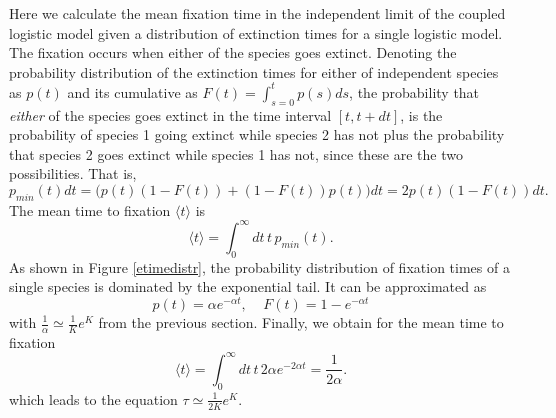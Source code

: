 Here we calculate the mean fixation time in the independent limit of the coupled logistic model given a distribution of extinction times for a single logistic model. The fixation occurs when either of the species goes extinct. 
Denoting the probability distribution of the extinction times for either of independent species as $p(t)$ and its cumulative as $F(t)=\int_{s=0}^t p(s)ds$, the probability that \emph{either} of the species goes extinct in the time interval $[t,t+dt]$, is the probability of species 1 going extinct while species 2 has not plus the probability that species 2 goes extinct while species 1 has not, since these are the two possibilities. 
That is,
\begin{equation}
p_{min}(t)dt = \bigg(p(t)\left(1-F(t)\right)+\left(1-F(t)\right)p(t)\bigg)dt = 2p(t)\left(1-F(t)\right)dt.
\end{equation}
The mean time to fixation $\langle t\rangle$ is 
\begin{equation}
\langle t\rangle = \int_0^\infty dt\, t\, p_{min}(t).
\end{equation}
As shown in Figure \ref{etimedistr}, the probability distribution of fixation times of a single species is dominated by the exponential tail. It can be approximated as
\begin{equation}
p(t) = \alpha e^{-\alpha t},\;\;\;\;  F(t) = 1 - e^{-\alpha t}
\end{equation}
with $\frac{1}{\alpha}\simeq \frac{1}{K}e^K$ from the previous section. %
Finally, we obtain for the mean time to fixation
\begin{equation}
\langle t\rangle = \int_0^\infty dt\, t\, 2\alpha e^{-2\alpha t} = \frac{1}{2\alpha}. \label{indietime}
\end{equation}
which leads to the equation $\tau \simeq \frac{1}{2K} e^K$. 


